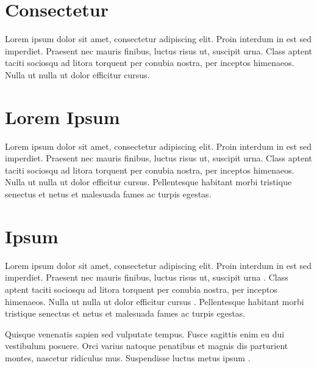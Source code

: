 \section{Consectetur}
Lorem ipsum dolor sit amet, consectetur adipiscing elit. Proin interdum in est sed imperdiet. Praesent nec mauris finibus, luctus risus ut, suscipit urna. Class aptent taciti sociosqu ad litora torquent per conubia nostra, per inceptos himenaeos. Nulla ut nulla ut dolor efficitur cursus.

\section{Lorem Ipsum}
Lorem ipsum dolor sit amet, consectetur adipiscing elit. Proin interdum in est sed imperdiet. Praesent nec mauris finibus, luctus risus ut, suscipit urna. Class aptent taciti sociosqu ad litora torquent per conubia nostra, per inceptos himenaeos. Nulla ut nulla ut dolor efficitur cursus. Pellentesque habitant morbi tristique senectus et netus et malesuada fames ac turpis egestas.

\section{Ipsum}
Lorem ipsum dolor sit amet, consectetur adipiscing elit. Proin interdum in est sed imperdiet. Praesent nec mauris finibus, luctus risus ut, suscipit urna \cite{mcgaughey2019phonon,jiang2015graphene,khan2015equilibrium}. Class aptent taciti sociosqu ad litora torquent per conubia nostra, per inceptos himenaeos. Nulla ut nulla ut dolor efficitur cursus \cite{moore1998cramming}. Pellentesque habitant morbi tristique senectus et netus et malesuada fames ac turpis egestas.

Quisque venenatis sapien sed vulputate tempus. Fusce sagittis enim eu dui vestibulum posuere. Orci varius natoque penatibus et magnis dis parturient montes, nascetur ridiculus mus. Suspendisse luctus metus ipsum \cite{wang2020frank,zhang2020molecular}.